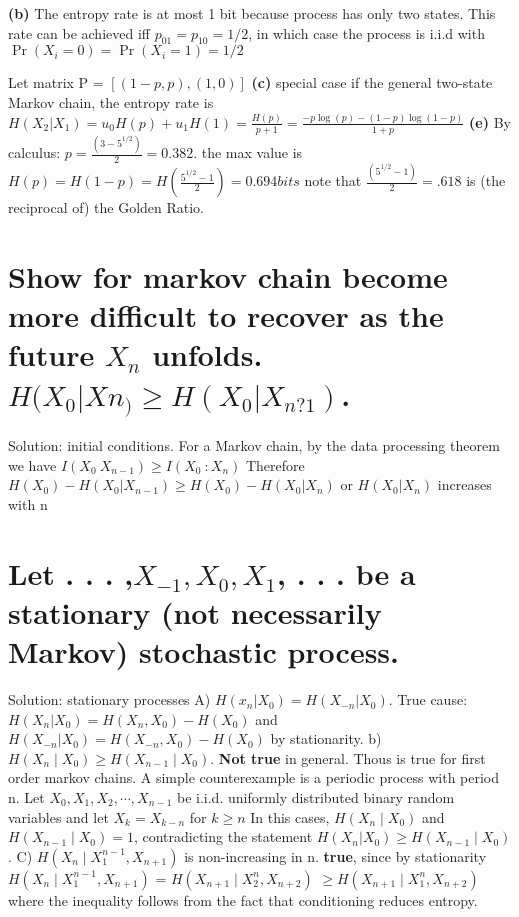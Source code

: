 \documentclass[10pt]{article}
\begin{document}
\begin{tiny}
\begin{multicols}{3}
\textbf{(b)} The entropy rate is at most 1 bit because process has only two states. This rate can be achieved iff \(p_{01}=p_{10}=1/2 \), in which case the process is i.i.d with \( \Pr(X_i = 0) =\Pr(X_i=1) = 1/2 \)

Let matrix P = $[ (1-p, p), (1, 0)]$ 
\textbf{(c)} special case if the general two-state Markov chain, the entropy rate is \( H(X_2 | X_1)=u_0H(p)+u_1H(1)=\frac{H(p)}{p+1} = \frac{-p\log(p)-(1-p)\log(1-p)}{1+p} \)
\textbf{(e)} By calculus: \( p=\frac{(3-5^{1/2})}{2}=0.382.\) the max value is \(H(p)=H(1-p)=H(\frac{5^{1/2}-1}{2}) = 0.694bits\)
note that \( \frac{(5^{1/2}-1)}{2} =.618\) is (the reciprocal of) the Golden Ratio.

\section*{Show for markov chain become more difficult to recover as the future $X_n$ unfolds. $H (X_0|Xn_) \ge H (X_0|X_{n?1})$.}
Solution: initial conditions. For a Markov chain, by the data processing theorem we have $I(X_0  \: X_{n-1}) \ge I(X_0 \ : X_n)$ Therefore $H(X_0) - H(X_0 | X_{n-1}) \ge H(X_0) - H(X_0 | X_n)$ or $H(X_0 | X_n)$  increases with n

\section*{Let	. . . ,$ X_{-1}, X_0, X_1$, . . . be	a stationary (not necessarily Markov) stochastic process.}
Solution: stationary processes A) $H(x_n | X_0) = H(X_{-n} | X_0).$ True cause: $H(X_n | X_0) = H(X_n,X_0) - H(X_0)$ and $H(X_{-n} | X_0) = H(X_{-n},X_0) - H(X_0)$ by stationarity.
b) \(H(X_n\mid X_0) \ge H(X_{n-1} \mid X_0). \) \textbf{Not true} in general. Thous is true for first order markov chains. A simple counterexample is a periodic process with period n. Let $X_0,X_1,X_2,\cdots,X_{n-1}$ be i.i.d. uniformly distributed binary random variables and let \(X_k =X_{k-n}\) for \( k \ge n \) In this cases, $H(X_n \mid X_0)$ and $H(X_{n-1} \mid X_0) = 1$, contradicting the statement $H(X_n | X_0) \ge H(X_{n-1} \mid X_0)$. C) \(H(X_n \mid X_1^{n-1}, X_{n+1}) \) is non-increasing in n. \textbf{true}, since by stationarity \(H(X_n \mid X_1^{n-1}, X_{n+1}) \) = \(H(X_{n+1} \mid X_2^{n}, X_{n+2}) \)  \( \ge H(X_{n+1} \mid X_1^{n}, X_{n+2}) \) where the inequality follows from the fact that conditioning reduces entropy.







\end{multicols}
\end{tiny}
\end{document}

